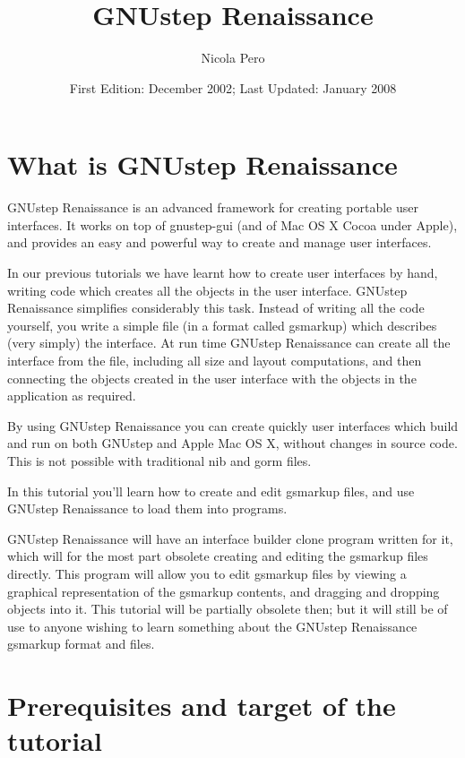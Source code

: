 \documentclass[a4paper]{article}
\begin{document}
\author{Nicola Pero}
\title{GNUstep Renaissance}
\date{First Edition: December 2002; Last Updated: January 2008}
\maketitle

\section{What is GNUstep Renaissance}

GNUstep Renaissance is an advanced framework for creating portable
user interfaces.  It works on top of gnustep-gui (and of Mac OS X
Cocoa under Apple), and provides an easy and powerful way to create
and manage user interfaces.

In our previous tutorials we have learnt how to create user interfaces
by hand, writing code which creates all the objects in the user
interface.  GNUstep Renaissance simplifies considerably this task.
Instead of writing all the code yourself, you write a simple file (in
a format called gsmarkup) which describes (very simply) the interface.
At run time GNUstep Renaissance can create all the interface from the
file, including all size and layout computations, and then connecting
the objects created in the user interface with the objects in the
application as required.

By using GNUstep Renaissance you can create quickly user interfaces
which build and run on both GNUstep and Apple Mac OS X, without
changes in source code.  This is not possible with traditional nib and
gorm files.

In this tutorial you'll learn how to create and edit gsmarkup files,
and use GNUstep Renaissance to load them into programs.

GNUstep Renaissance will have an interface builder clone program
written for it, which will for the most part obsolete creating and
editing the gsmarkup files directly.  This program will allow you to
edit gsmarkup files by viewing a graphical representation of the
gsmarkup contents, and dragging and dropping objects into it.  This
tutorial will be partially obsolete then; but it will still be of use
to anyone wishing to learn something about the GNUstep Renaissance
gsmarkup format and files.

\section{Prerequisites and target of the tutorial}
\end{document}
